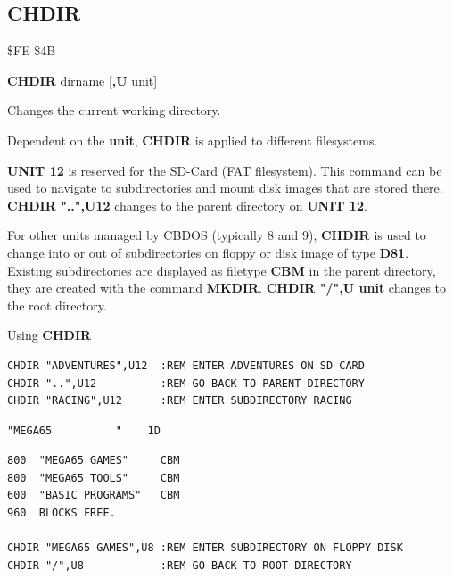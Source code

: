 
\newpage
\subsection{CHDIR}
\begin{description}[leftmargin=2cm,style=nextline]
\item [Token:] \$FE \$4B
\item [Format:] {\bf CHDIR} dirname [{\bf,U} unit]
\item [Usage:] Changes the current working directory.

   \dirnamedefinition

   Dependent on the {\bf unit}, {\bf CHDIR} is applied to
   different filesystems.

   {\bf UNIT 12} is reserved for the SD-Card (FAT filesystem).
   This command can be used to navigate to subdirectories
   and mount disk images that are stored there.
   {\bf CHDIR "..",U12} changes to the parent directory on {\bf UNIT 12}.

   For other units managed by CBDOS (typically 8 and 9),
   {\bf CHDIR} is used to change into or out of subdirectories
   on floppy or disk image of type {\bf D81}.
   Existing subdirectories are displayed as filetype {\bf CBM}
   in the parent directory, they are created with the command {\bf MKDIR}.
   {\bf CHDIR "/",U unit} changes to the root directory.

\item [Examples:] Using {\bf CHDIR}
\begin{tcolorbox}[colback=black,coltext=white]
\verbatimfont{\codefont}
\begin{verbatim}
CHDIR "ADVENTURES",U12  :REM ENTER ADVENTURES ON SD CARD
CHDIR "..",U12          :REM GO BACK TO PARENT DIRECTORY
CHDIR "RACING",U12      :REM ENTER SUBDIRECTORY RACING
\end{verbatim}

\selectfont{\codefont 0}
\begin{tcolorbox}[colback=white,coltext=black,arc=0mm,boxrule=0mm,
       left*=0.5mm,right*=0mm,top=0mm,bottom=0mm,nobeforeafter,
       left skip=0.5mm,
       width=28mm,height=3mm,valign=center]
\begin{verbatim}
"MEGA65          "    1D
\end{verbatim}
\end{tcolorbox}
\begin{verbatim}
800  "MEGA65 GAMES"     CBM
800  "MEGA65 TOOLS"     CBM
600  "BASIC PROGRAMS"   CBM
960  BLOCKS FREE.

CHDIR "MEGA65 GAMES",U8 :REM ENTER SUBDIRECTORY ON FLOPPY DISK
CHDIR "/",U8            :REM GO BACK TO ROOT DIRECTORY
\end{verbatim}
\end{tcolorbox}
\end{description}

